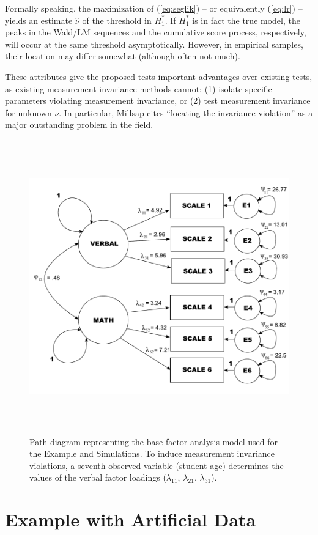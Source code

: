 \documentclass[man]{apa}
\begin{document}
Formally speaking, the maximization of (\ref{eq:seglik}) -- or equivalently (\ref{eq:lr}) --
yields an estimate $\hat \nu$ of the threshold in $H_1^*$. If $H_1^*$ is in fact the true model,
the peaks in the Wald/LM sequences and the cumulative score process, respectively, will occur at the
same threshold asymptotically. However, in empirical samples, their location may differ somewhat
(although often not much).

These attributes give the proposed tests important advantages over
existing tests, as existing measurement invariance methods cannot:
(1) isolate specific parameters violating measurement invariance, or
(2) test measurement invariance for unknown $\nu$. 
In particular, Millsap \citeyear{Mil05} cites
``locating the invariance violation'' as a major outstanding problem
in the field.


\begin{figure}
\caption{Path diagram representing the base factor analysis model used for
  the Example and Simulations.  To induce measurement invariance
  violations, a seventh observed variable (student age) determines the
values of the verbal factor loadings ($\lambda_{11}$, $\lambda_{21}$,
$\lambda_{31}$).}
\label{fig:famod}
\includegraphics[height=5in]{famod.pdf}
%
\end{figure}


\section{Example with Artificial Data}
\end{document}
